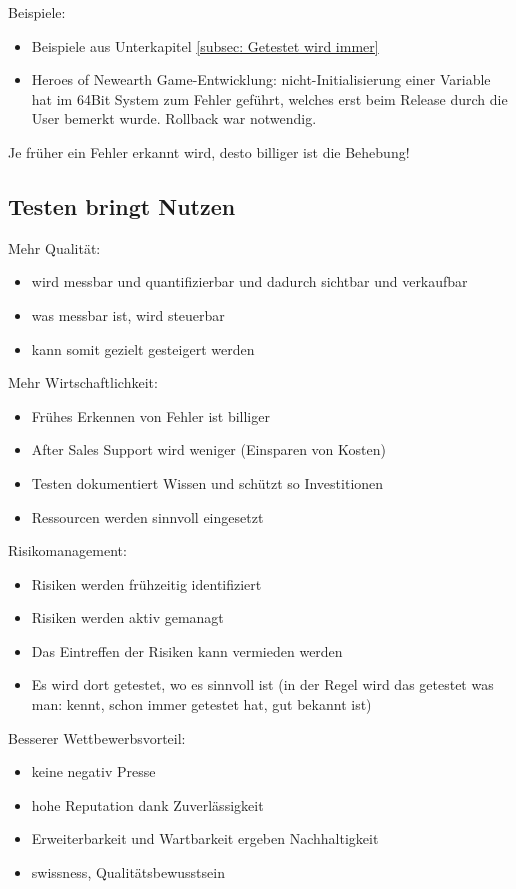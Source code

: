Beispiele:
\begin{itemize}
    \item Beispiele aus Unterkapitel \ref{subsec: Getestet wird immer}
    \item Heroes of Newearth Game-Entwicklung: nicht-Initialisierung einer Variable hat im 64Bit System zum Fehler geführt, welches erst beim Release durch die User bemerkt wurde. Rollback war notwendig.
\end{itemize}

Je früher ein Fehler erkannt wird, desto billiger ist die Behebung!

\subsection{Testen bringt Nutzen}
Mehr Qualität:
\begin{itemize}
    \item wird messbar und quantifizierbar und dadurch sichtbar und verkaufbar
    \item was messbar ist, wird steuerbar
    \item kann somit gezielt gesteigert werden
\end{itemize}

Mehr Wirtschaftlichkeit:
\begin{itemize}
    \item Frühes Erkennen von Fehler ist billiger
    \item After Sales Support wird weniger (Einsparen von Kosten)
    \item Testen dokumentiert Wissen und schützt so Investitionen
    \item Ressourcen werden sinnvoll eingesetzt
\end{itemize}

Risikomanagement:
\begin{itemize}
    \item Risiken werden frühzeitig identifiziert
    \item Risiken werden aktiv gemanagt
    \item Das Eintreffen der Risiken kann vermieden werden
    \item Es wird dort getestet, wo es sinnvoll ist (in der Regel wird das getestet was man: kennt, schon immer getestet hat, gut bekannt ist)
\end{itemize}

Besserer Wettbewerbsvorteil:
\begin{itemize}
    \item keine negativ Presse
    \item hohe Reputation dank Zuverlässigkeit
    \item Erweiterbarkeit und Wartbarkeit ergeben Nachhaltigkeit
    \item swissness, Qualitätsbewusstsein
\end{itemize}


